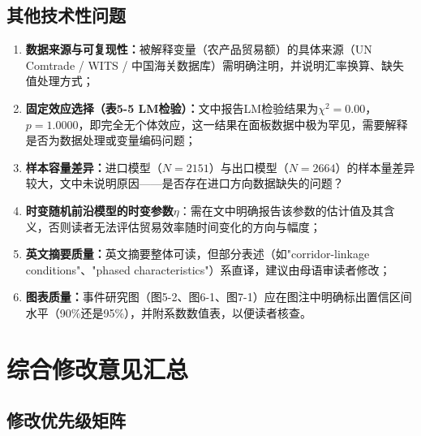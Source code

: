 \documentclass[12pt, a4paper]{article}
\begin{document}
\subsection{其他技术性问题}
\label{sec:technical}

\begin{minorbox}

\begin{enumerate}[label=\arabic*)]
  \item \textbf{数据来源与可复现性：}被解释变量（农产品贸易额）的具体来源（UN Comtrade / WITS / 中国海关数据库）需明确注明，并说明汇率换算、缺失值处理方式；

  \item \textbf{固定效应选择（表5-5 LM检验）：}文中报告LM检验结果为$\chi^2 = 0.00$，$p = 1.0000$，即完全无个体效应，这一结果在面板数据中极为罕见，需要解释是否为数据处理或变量编码问题；

  \item \textbf{样本容量差异：}进口模型（$N=2151$）与出口模型（$N=2664$）的样本量差异较大，文中未说明原因——是否存在进口方向数据缺失的问题？

  \item \textbf{时变随机前沿模型的时变参数$\eta$}：需在文中明确报告该参数的估计值及其含义，否则读者无法评估贸易效率随时间变化的方向与幅度；

  \item \textbf{英文摘要质量：}英文摘要整体可读，但部分表述（如"corridor-linkage conditions"、"phased characteristics"）系直译，建议由母语审读者修改；

  \item \textbf{图表质量：}事件研究图（图5-2、图6-1、图7-1）应在图注中明确标出置信区间水平（90\%还是95\%），并附系数数值表，以便读者核查。
\end{enumerate}
\end{minorbox}

\section{综合修改意见汇总}

\subsection{修改优先级矩阵}
\end{document}
